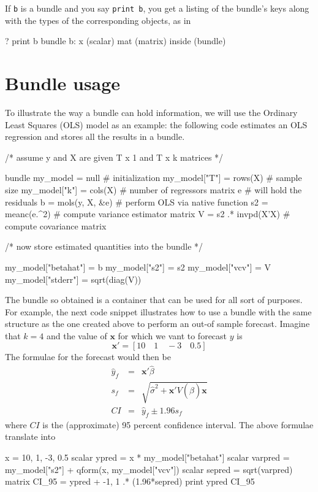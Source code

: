 If \texttt{b} is a bundle and you say \texttt{print b}, you get a
listing of the bundle's keys along with the types of the corresponding
objects, as in

\begin{code}
? print b
bundle b:
 x (scalar)
 mat (matrix)
 inside (bundle)
\end{code}

\section{Bundle usage}
\label{sec:bundle-usage}

To illustrate the way a bundle can hold information, we will use the
Ordinary Least Squares (OLS) model as an example: the following code
estimates an OLS regression and stores all the results in a bundle.

\begin{code}
/* assume y and X are given T x 1 and T x k matrices */

bundle my_model = null               # initialization
my_model["T"] = rows(X)              # sample size
my_model["k"] = cols(X)              # number of regressors
matrix e                             # will hold the residuals
b = mols(y, X, &e)                   # perform OLS via native function
s2 = meanc(e.^2)                     # compute variance estimator
matrix V = s2 .* invpd(X'X)          # compute covariance matrix

/* now store estimated quantities into the bundle */

my_model["betahat"] = b
my_model["s2"] = s2
my_model["vcv"] = V
my_model["stderr"] = sqrt(diag(V))
\end{code}

The bundle so obtained is a container that can be used for all sort of
purposes. For example, the next code snippet illustrates how to use
a bundle with the same structure as the one created above to perform
an out-of sample forecast. Imagine that $k=4$ and the value of
$\mathbf{x}$ for which we vant to forecast $y$ is
\[
  \mathbf{x}' = [ 10 \quad 1  \quad -3 \quad 0.5 ]
\]
The formulae for the forecast would then be
\begin{eqnarray*}
  \hat{y}_f & = & \mathbf{x}'\hat{\beta} \\
  s_f & = & \sqrt{\hat{\sigma}^2 + \mathbf{x}'V(\hat{\beta})\mathbf{x}} \\
  CI & = & \hat{y}_f \pm 1.96 s_f 
\end{eqnarray*}
where $CI$ is the (approximate) 95 percent confidence interval. The
above formulae translate into
\begin{code}
  x = { 10, 1, -3, 0.5 }
  scalar ypred    = x * my_model["betahat"]
  scalar varpred  = my_model["s2"] + qform(x, my_model["vcv"])
  scalar sepred   = sqrt(varpred)
  matrix CI_95    = ypred + {-1, 1} .* (1.96*sepred)
  print ypred CI_95
\end{code}

